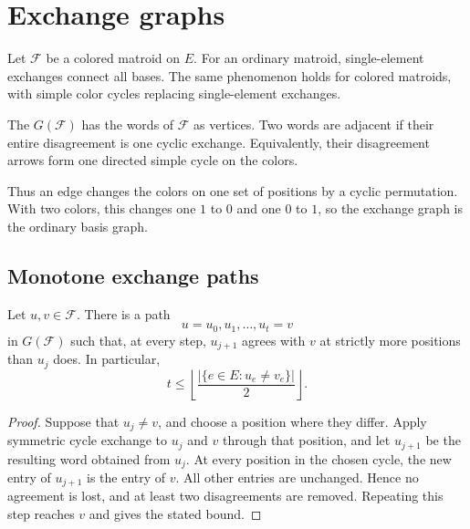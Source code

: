 
\section[exchangeGraphs]{Exchange graphs}

Let $\mathcal F$ be a colored matroid on $E$.
For an ordinary matroid, single-element exchanges connect all bases. The same
phenomenon holds for colored matroids, with simple color cycles replacing
single-element exchanges.

\begin{definition}
The  $G(\mathcal F)$ has the words of $\mathcal F$ as
vertices. Two words are adjacent if their entire disagreement is one cyclic
exchange. Equivalently, their disagreement arrows form one directed simple
cycle on the colors.
\end{definition}

Thus an edge changes the colors on one set of positions by a cyclic
permutation. With two colors, this changes one $1$ to $0$ and one $0$ to $1$,
so the exchange graph is the ordinary basis graph.

\subsection[monotonePaths]{Monotone exchange paths}

\begin{proposition}
Let $u,v\in\mathcal F$. There is a path
\[
 u=u_0,u_1,\dotsc,u_t=v
\]
in $G(\mathcal F)$ such that, at every step, $u_{j+1}$ agrees with $v$ at
strictly more positions than $u_j$ does. In particular,
\[
 t\leq
 \left\lfloor\frac{\lvert\{e\in E:u_e\ne v_e\}\rvert}{2}\right\rfloor.
\]
\end{proposition}

\begin{proof}
Suppose that $u_j\ne v$, and choose a position where they differ. Apply
symmetric cycle exchange to $u_j$ and $v$ through that position, and let
$u_{j+1}$ be the resulting word obtained from $u_j$. At every position in the
chosen cycle, the new entry of $u_{j+1}$ is the entry of $v$. All other entries
are unchanged. Hence no agreement is lost, and at least two disagreements are
removed. Repeating this step reaches $v$ and gives the stated bound.
\end{proof}

